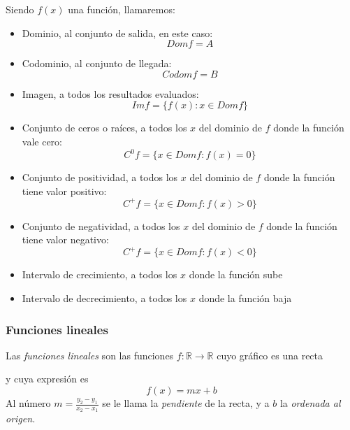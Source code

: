 \documentclass[Análisis.root.tex]{subfiles}
\newcommand{\R}{\mathbb{R}}
\begin{document}
        Siendo \(f(x)\) una función, llamaremos:
        \begin{itemize}
            \item Dominio, al conjunto de salida, en este caso: \[Dom f=A\]
            \item Codominio, al conjunto de llegada: \[Codom f=B\]
            \item Imagen, a todos los resultados evaluados: \[Im f=\{f(x):x \in Dom f\}\]
            \item Conjunto de ceros o raíces, a todos los \(x\) del dominio de \(f\) donde la función vale cero: \[C^0 f=\{x\in Dom f:f(x)=0\}\]
            \item Conjunto de positividad, a todos los \(x\) del dominio de \(f\) donde la función tiene valor positivo: \[C^+ f=\{x\in Dom f:f(x) > 0\}\]
            \item Conjunto de negatividad, a todos los \(x\) del dominio de \(f\) donde la función tiene valor negativo: \[C^+ f=\{x\in Dom f:f(x) < 0\}\]
            \item Intervalo de crecimiento, a todos los \(x\) donde la función sube
            \item Intervalo de decrecimiento, a todos los \(x\) donde la función baja
        \end{itemize}
    \subsubsection{Funciones lineales}
        Las \textit{funciones lineales} son las funciones \(f: \R \rightarrow \R\) cuyo gráfico es una recta
        \begin{center}
        \end{center}
        y cuya expresión es \[f(x)=mx+b\] Al número \(m = \frac{y_2-y_1}{x_2-x_1}\) se le llama la \textit{pendiente} de la recta, y a \(b\) la \textit{ordenada al origen.}
\end{document}
